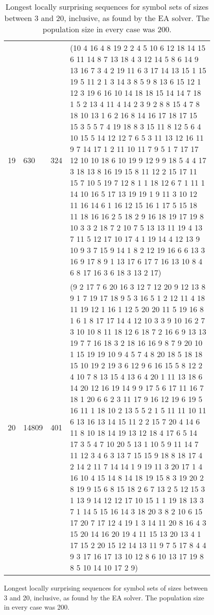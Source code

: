 \begin{figure}
\begin{table}[H]
\begin{tabularx}{\textwidth}{| X | X | X | p{13cm} |}
19 & 630 & 324 & (10 4 16 4 8 19 2 2 4 5 10 6 12 18 14 15 6 11 14 8 7 13 18 4 3 12 14 5 8 6 14 9 13 16 7 3 4 2 19 11 6 3 17 14 13 15 1 15 19 5 11 2 1 3 14 3 8 5 9 8 13 6 15 12 1 12 3 19 6 16 10 14 18 18 15 14 14 7 18 1 5 2 13 4 11 4 14 2 3 9 2 8 8 15 4 7 8 18 10 13 1 6 2 16 8 14 16 17 18 17 15 15 3 5 5 7 4 19 18 8 3 15 11 8 12 5 6 4 10 15 5 14 12 12 7 6 5 3 11 13 12 16 11 9 7 14 17 1 2 11 10 11 7 9 5 1 7 17 17 12 10 10 18 6 10 19 9 12 9 9 18 5 4 4 17 3 18 13 8 16 19 15 8 11 12 2 15 17 11 15 7 10 5 19 7 12 8 1 1 18 12 6 7 1 11 1 14 10 16 5 17 13 19 19 1 9 11 3 10 12 11 16 14 6 1 16 12 15 16 1 17 5 15 18 11 18 16 16 2 5 18 2 9 16 18 19 17 19 8 10 3 3 2 18 7 2 10 7 5 13 13 11 19 4 13 7 11 5 12 17 10 17 4 1 19 14 4 12 13 9 10 9 3 7 15 9 14 1 8 2 12 19 16 6 6 13 3 16 9 17 8 9 1 13 17 6 17 7 16 13 10 8 4 6 8 17 16 3 6 18 3 13 2 17) \\
20 & 14809 & 401 & (9 2 17 7 6 20 16 3 12 7 12 20 9 12 13 8 9 1 7 19 17 18 9 5 3 16 5 1 2 12 11 4 18 11 19 12 1 16 1 12 5 20 20 11 5 19 16 8 1 6 1 8 17 17 14 4 12 10 3 3 9 10 16 2 7 3 10 10 8 11 18 12 6 18 7 2 16 6 9 13 13 19 7 7 16 18 3 2 18 16 16 9 8 7 9 20 10 1 15 19 19 10 9 4 5 7 4 8 20 18 5 18 18 15 10 19 2 19 3 6 12 9 6 16 15 5 8 12 2 4 10 7 8 13 15 4 13 6 4 20 1 11 13 18 6 14 20 12 16 19 14 9 9 17 5 6 17 11 16 7 18 1 20 6 6 2 3 11 17 9 16 12 19 6 19 5 16 11 1 18 10 2 13 5 5 2 1 5 11 11 10 11 6 13 16 13 14 15 11 2 2 15 7 20 4 14 6 11 8 10 18 14 19 13 12 18 4 17 6 5 14 17 3 5 4 7 10 20 5 13 1 10 5 9 11 14 7 11 12 3 4 6 3 13 7 15 15 9 18 8 18 17 4 2 14 2 11 7 14 14 1 9 19 11 3 20 17 1 4 16 10 4 15 14 8 14 18 19 15 8 3 19 20 2 8 19 9 15 6 8 15 18 2 6 7 13 2 5 12 15 3 1 13 9 14 12 12 17 10 15 1 1 19 18 13 3 7 1 14 5 15 16 14 3 18 20 3 8 2 10 6 15 17 20 7 17 12 4 19 1 3 14 11 20 8 16 4 3 15 20 14 16 20 19 4 11 15 13 20 13 4 1 17 15 2 20 15 12 14 13 11 9 7 5 17 8 4 4 9 3 17 16 17 13 10 12 8 6 10 13 17 19 8 8 5 10 14 10 17 2 9) \\
\hline
\end{tabularx}
\caption{Longest locally surprising sequences for symbol sets of sizes between 3 and 20, inclusive, as found by the EA solver. The population size in every case was 200.}
\label{table:local}
\end{table}
\end{figure}
